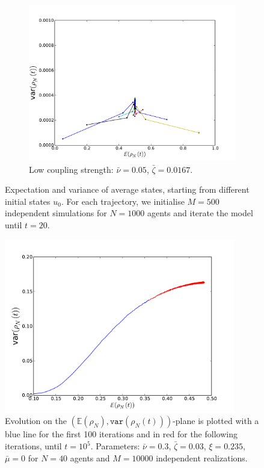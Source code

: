 \documentclass[]{article}
\begin{document}
\begin{figure}
\begin{subfigure}[b]{0.7\textwidth}
\includegraphics[width=\textwidth]{variance_mean_N1000_M500_mixed_fully_20timesteps.pdf}
\caption{ Low coupling strength: $\bar{\nu}=0.05$, $\bar{\zeta}=0.0167$.}
\label{fig:fig:variance_mean_mixed}
\end{subfigure}
\caption{Expectation and variance of average states, starting from different initial states $u_0$. For each trajectory, we initialise $M=500$ independent simulations for $N=1000$ agents and iterate the model until $t=20$.}
\label{fig:fig:variance_mean}
\end{figure}


\begin{figure}
\includegraphics[width=0.9\textwidth]{slaving_M10e4_N40-t_10e5}
\caption{ Evolution on the $(\mathbb{E}(\rho_N),\texttt{var}(\rho_N(t)))$-plane is plotted with a blue line for the first 100 iterations and in red for the following iterations, until $t=10^5$. Parameters: $\bar{\nu}=0.3$, $\bar{\zeta}=0.03$, $\xi = 0.235$, $\bar{\mu}=0$ for $N=40$ agents and $M=10000$ independent realizations.}
\label{slaving}
\end{figure}
\end{document}
